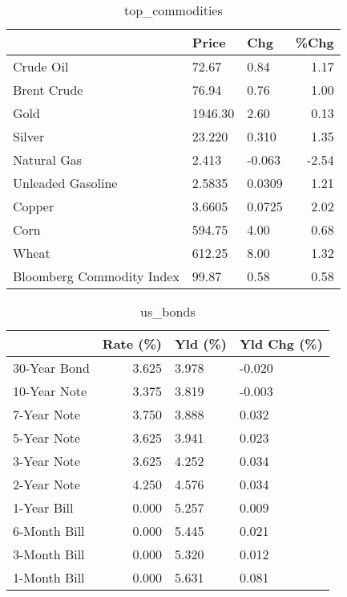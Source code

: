 \documentclass{article}%
\begin{document}
\begin{table}[htbp]%
\caption{top\_commodities}%
\centering%
\begin{adjustbox}{width=1\textwidth}%
\begin{tabular}{lllr}
\toprule
                          &   Price &    Chg &  \%Chg \\
\midrule
               Crude Oil  &   72.67 &   0.84 &  1.17 \\
             Brent Crude  &   76.94 &   0.76 &  1.00 \\
                    Gold  & 1946.30 &   2.60 &  0.13 \\
                  Silver  &  23.220 &  0.310 &  1.35 \\
             Natural Gas  &   2.413 & -0.063 & -2.54 \\
       Unleaded Gasoline  &  2.5835 & 0.0309 &  1.21 \\
                  Copper  &  3.6605 & 0.0725 &  2.02 \\
                    Corn  &  594.75 &   4.00 &  0.68 \\
                   Wheat  &  612.25 &   8.00 &  1.32 \\
Bloomberg Commodity Index &   99.87 &   0.58 &  0.58 \\
\bottomrule
\end{tabular}
%
\end{adjustbox}%
\end{table}

%


\begin{table}[htbp]%
\caption{us\_bonds}%
\centering%
\begin{adjustbox}{width=1\textwidth}%
\begin{tabular}{lrll}
\toprule
             &  Rate (\%) & Yld (\%) & Yld Chg (\%) \\
\midrule
30-Year Bond &     3.625 &   3.978 &      -0.020 \\
10-Year Note &     3.375 &   3.819 &      -0.003 \\
 7-Year Note &     3.750 &   3.888 &       0.032 \\
 5-Year Note &     3.625 &   3.941 &       0.023 \\
 3-Year Note &     3.625 &   4.252 &       0.034 \\
 2-Year Note &     4.250 &   4.576 &       0.034 \\
 1-Year Bill &     0.000 &   5.257 &       0.009 \\
6-Month Bill &     0.000 &   5.445 &       0.021 \\
3-Month Bill &     0.000 &   5.320 &       0.012 \\
1-Month Bill &     0.000 &   5.631 &       0.081 \\
\bottomrule
\end{tabular}
%
\end{adjustbox}%
\end{table}
\end{document}
